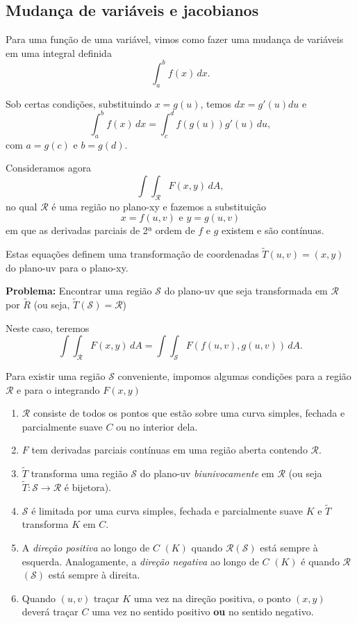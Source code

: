 \subsection{Mudança de variáveis e jacobianos}

Para uma função de uma variável, vimos como fazer uma mudança de variáveis em uma integral definida \[\int_a^b f(x) \,dx.\]

Sob certas condições, substituindo \(x = g(u)\), temos \(dx = g'(u) du\) e \[\int_a^b f(x) \,dx = \int_c^d f(g(u)) g'(u) \,du,\] com \(a = g(c)\) e \(b = g(d)\).

Consideramos agora \[\int\int_\mathcal{R} F(x,y) \,dA,\] no qual \(\mathcal{R}\) é uma região no plano-xy e fazemos a substituição \[x = f(u,v) \text{ e } y = g(u,v)\] em que as derivadas parciais de 2ª ordem de \(f\) e \(g\) existem e são contínuas.

Estas equações definem uma transformação de coordenadas \(\tilde{T}(u,v) = (x,y)\) do plano-uv para o plano-xy.

\textbf{Problema: } Encontrar uma região \(\mathcal{S}\) do plano-uv que seja transformada em \(\mathcal{R}\) por \(\tilde{R}\) (ou seja, \(\tilde{T}(\mathcal{S}) = \mathcal{R}\))

Neste caso, teremos \[\int\int_\mathcal{R} F(x,y) \,dA = \int\int_\mathcal{S} F(f(u,v),g(u,v)) \,dA.\]

Para existir uma região \(\mathcal{S}\) conveniente, impomos algumas condições para a região \(\mathcal{R}\) e para o integrando \(F(x,y)\)
    \begin{enumerate}
        \item \(\mathcal{R}\) consiste de todos os pontos que estão sobre uma curva simples, fechada e parcialmente suave \(C\) ou no interior dela.
        \item \(F\) tem derivadas parciais contínuas em uma região aberta contendo \(\mathcal{R}\).
        \item \(\tilde{T}\) transforma uma região \(\mathcal{S}\) do plano-uv \textit{biunivocamente} em \(\mathcal{R}\) (ou seja \(\tilde{T}:\mathcal{S} \to \mathcal{R}\) é bijetora).
        \item \(\mathcal{S}\) é limitada por uma curva simples, fechada e parcialmente suave \(K\) e \(\tilde{T}\) transforma \(K\) em \(C\).
        \item A \textit{direção positiva} ao longo de \(C\) \((K)\) quando \(\mathcal{R}\)\((\mathcal{S})\) está sempre à esquerda. Analogamente, a \textit{direção negativa} ao longo de \(C\) \((K)\) é quando \(\mathcal{R}\) \((\mathcal{S})\) está sempre à direita.
        \item Quando \((u,v)\) traçar \(K\) uma vez na direção positiva, o ponto \((x,y)\) deverá traçar \(C\) uma vez no sentido positivo \textbf{ou} no sentido negativo.
    \end{enumerate}

